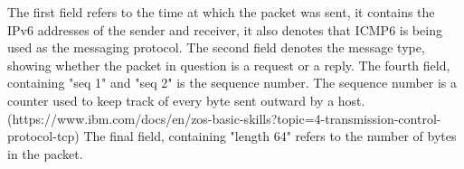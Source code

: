 
\newline
The first field refers to the time at which the packet was sent, it contains the IPv6 addresses of the sender and receiver, it also denotes that ICMP6 is being used as the messaging protocol. The second field denotes the message type, showing whether the packet in question is a request or a reply. The fourth field, containing "seq 1" and "seq 2" is the sequence number. The sequence number is a counter used to keep track of every byte sent outward by a host. (https://www.ibm.com/docs/en/zos-basic-skills?topic=4-transmission-control-protocol-tcp) The final field, containing "length 64" refers to the number of bytes in the packet.
